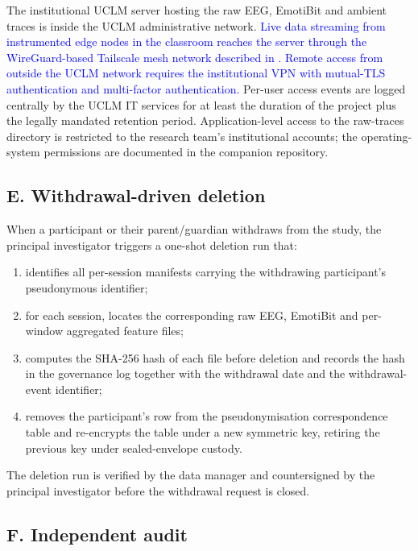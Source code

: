 The institutional UCLM server hosting the raw EEG, EmotiBit and ambient traces is inside the UCLM administrative network. \textcolor{blue}{Live data streaming from instrumented edge nodes in the classroom reaches the server through the WireGuard-based Tailscale mesh network described in . Remote access from outside the UCLM network requires the institutional VPN with mutual-TLS authentication and multi-factor authentication.} Per-user access events are logged centrally by the UCLM IT services for at least the duration of the project plus the legally mandated retention period. Application-level access to the raw-traces directory is restricted to the research team's institutional accounts; the operating-system permissions are documented in the companion repository.

\subsection*{E. Withdrawal-driven deletion}

When a participant or their parent/guardian withdraws from the study, the principal investigator triggers a one-shot deletion run that:

\begin{enumerate}[label=E.\arabic*., leftmargin=*, itemsep=2pt]
  \item identifies all per-session manifests carrying the withdrawing participant's pseudonymous identifier;
  \item for each session, locates the corresponding raw EEG, EmotiBit and per-window aggregated feature files;
  \item computes the SHA-256 hash of each file before deletion and records the hash in the governance log together with the withdrawal date and the withdrawal-event identifier;
  \item removes the participant's row from the pseudonymisation correspondence table and re-encrypts the table under a new symmetric key, retiring the previous key under sealed-envelope custody.
\end{enumerate}

The deletion run is verified by the data manager and countersigned by the principal investigator before the withdrawal request is closed.

\subsection*{F. Independent audit}


